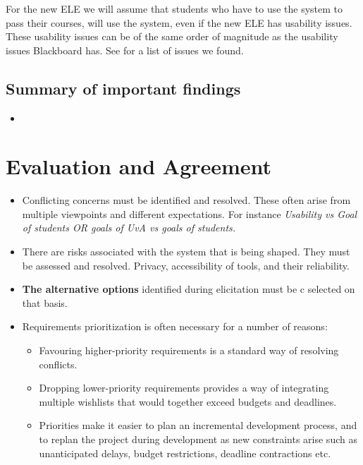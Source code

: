 	
	For the new ELE we will assume that students who have to use the system to pass their courses, will use the system, even if the new ELE has usability issues. These usability issues can be of the same order of magnitude as the usability issues Blackboard has. See  for a list of issues we found. 
	
	\section{Summary of important findings}
	\begin{itemize}
		\item 
	\end{itemize}


\chapter{Evaluation and Agreement}
\begin{itemize}
	\item Conflicting concerns must be identified and resolved. These often arise from multiple
	viewpoints and different expectations. For instance \textit{Usability vs Goal of students OR goals of UvA vs goals of students.}
	\item There are risks associated with the system that is being shaped. They must be assessed
	and resolved. {Privacy, accessibility of tools, and their reliability.}
	\item \textbf{The alternative options} identified during elicitation must be c
                                                                                selected on that basis. 
	\item Requirements prioritization is often necessary for a number of reasons: \begin{itemize}
		\item Favouring higher-priority requirements is a standard way of resolving conflicts.
		\item Dropping lower-priority requirements provides a way of integrating multiple wishlists
		that would together exceed budgets and deadlines.
		\item Priorities make it easier to plan an incremental development process, and to replan
		the project during development as new constraints arise such as unanticipated delays,
		budget restrictions, deadline contractions etc.
	\end{itemize}

\end{itemize}

